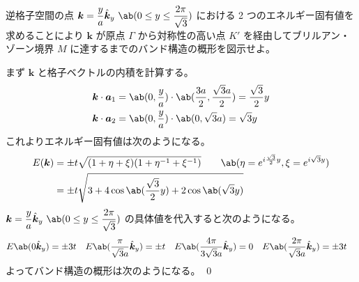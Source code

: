 \documentclass[uplatex,dvipdfmx,a4paper,11pt]{jlreq}
\makeatletter
\renewcommand{\aa}{\bm{a}}
\newcommand{\kk}{\bm{k}}
\numberwithin{equation}{section}
\theoremstyle{definition}
\renewenvironment{proof}[1][\proofname]{\par
  \normalfont
  \topsep6\p@\@plus6\p@ \trivlist
  \item[\hskip\labelsep{\bfseries #1}\@addpunct{\bfseries}]\ignorespaces\quad\par
}{%
  \qed\endtrivlist\@endpefalse
}
\renewcommand\proofname{証明}
\makeatother
\begin{document}
\begin{problem}
逆格子空間の点 $\kk = \dfrac{y}{a}\hat{\kk}_y\ \ab(0 \leq y \leq \dfrac{2\pi}{\sqrt{3}})$ における 2 つのエネルギー固有値を求めることにより $\kk$ が原点 $\Gamma$ から対称性の高い点 $K'$ を経由してブリルアン・ゾーン境界 $M$ に達するまでのバンド構造の概形を図示せよ。
\end{problem}
\begin{proof}
  まず $\kk$ と格子ベクトルの内積を計算する。
  \begin{align}
    \kk\cdot\aa_1 & = \ab(0, \frac{y}{a})\cdot\ab(\frac{3a}{2}, \frac{\sqrt{3}a}{2}) = \frac{\sqrt{3}}{2}y \\
    \kk\cdot\aa_2 & = \ab(0, \frac{y}{a})\cdot\ab(0, \sqrt{3}a) = \sqrt{3}y
  \end{align}
  これよりエネルギー固有値は次のようになる。
  \begin{align}
    E(\kk) & = \pm t\sqrt{(1 + \eta + \xi)(1 + \eta^{-1} + \xi^{-1})} \qquad \ab(\eta = e^{i\frac{\sqrt{3}}{2}y}, \xi = e^{i\sqrt{3}y}) \\
           & = \pm t\sqrt{3 + 4\cos\ab(\frac{\sqrt{3}}{2}y) + 2\cos\ab(\sqrt{3}y)}
  \end{align}
  $\kk = \dfrac{y}{a}\hat{\kk}_y\ \ab(0 \leq y \leq \dfrac{2\pi}{\sqrt{3}})$ の具体値を代入すると次のようになる。
  \begin{align}
    E\ab(0\hat{\kk}_y) & = \pm 3t & E\ab(\frac{\pi}{\sqrt{3}a}\hat{\kk}_y) & = \pm t & E\ab(\frac{4\pi}{3\sqrt{3}a}\hat{\kk}_y) & = 0 & E\ab(\frac{2\pi}{\sqrt{3}a}\hat{\kk}_y) & = \pm 3t
  \end{align}
  よってバンド構造の概形は次のようになる。
\end{proof}
\end{document}
